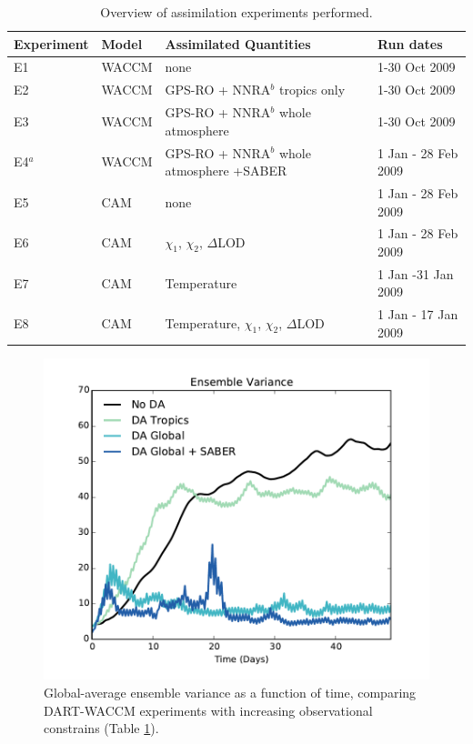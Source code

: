 \begin{table}
\caption{Overview of assimilation experiments performed.}
\centering
\begin{tabular}{p{2cm}p{2cm}p{6cm}p{4cm}}
	Experiment& Model &  Assimilated Quantities  & Run dates \\
\hline
E1 & WACCM &	none   & 1-30 Oct 2009	\\
E2 & WACCM &	GPS-RO + NNRA$^b$ tropics only & 1-30 Oct 2009	\\
E3 & WACCM &	GPS-RO + NNRA$^b$ whole atmosphere  & 1-30 Oct 2009	\\
E4$^a$ & WACCM &	GPS-RO + NNRA$^b$ whole atmosphere +SABER & 1 Jan - 28 Feb 2009\\	
E5 & CAM	&	none &  1 Jan - 28 Feb 2009 \\
E6 & CAM &	$\chi_1$, $\chi_2$, $\Delta$LOD	& 1 Jan - 28 Feb 2009 \\
E7 & CAM &	Temperature	& 1 Jan -31 Jan 2009	\\
E8 & CAM &	Temperature, $\chi_1$, $\chi_2$, $\Delta$LOD	& 1 Jan - 17 Jan 2009\\
\hline
\end{tabular}
\label{tab:expts}
\end{table}
\clearpage

 \begin{figure}
	 \includegraphics[width=\textwidth]{Paper_figures/ERPDA_paper_evalvariable_state_space.pdf}
	 \caption{Global-average ensemble variance as a function of time, comparing DART-WACCM experiments with increasing observational constrains (Table \ref{tab:expts}).}
	 \label{fig:evalvariable_state}
\end{figure}

